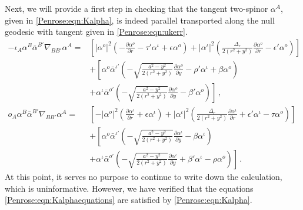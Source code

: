 Next, we will provide a first step in checking that the tangent two-spinor $\alpha^A$, given in \eqref{Penrose:eqn:Kalpha}, is indeed parallel transported along the null geodesic with tangent given in \eqref{Penrose:eqn:ukerr}.
\begin{equation}\label{Penrose:eqn:Kalphaequations}
\begin{aligned}
-\iota_A	\alpha^B \bar{\alpha}^{B'} \nabla_{BB'}\alpha^A = &\left\lbrack  |\alpha^o|^2
\left(-\frac{\partial \alpha^o}{\partial r} - \tau' \alpha^{\iota}+\epsilon \alpha^o \right) + |\alpha^{\iota}|^2
\left( \frac{\Delta_r}{2 (r^2+y^2)} \frac{\partial \alpha^{o}}{\partial r} - \epsilon' \alpha^{o} \right)\right
\rbrack \\
                                                                &+  \left\lbrack \alpha^o\bar{\alpha}^{\iota'}
                                                                \left(-\sqrt{\frac{a^2-y^2}{2
                                                                (r^2+y^2)}}\frac{\partial \alpha^o}{\partial y}
                                                            -\rho' \alpha^{\iota} + \beta \alpha^o \right) \right. \\
                                                            &\left.+  \alpha^{\iota}\bar{\alpha}^{o'} \left(-\sqrt{\frac{a^2-y^2}{2(r^2+y^2)}}\frac{\partial \alpha^o}{\partial y} -\beta' \alpha^o \right) \right\rbrack \, , \\
o_A	\alpha^B \bar{\alpha}^{B'} \nabla_{BB'}\alpha^A = &\left\lbrack -|\alpha^o|^2  \left(\frac{\partial \alpha^{\iota}}{\partial r}+\epsilon \alpha^{\iota} \right) + |\alpha^{\iota}|^2 \left( \frac{\Delta_r}{2(r^2+y^2)}  \frac{\partial \alpha^{\iota}}{\partial r} + \epsilon' \alpha^{\iota} - \tau \alpha^{o}\right) \right \rbrack  \\
                                                        &+  \left\lbrack \alpha^o\bar{\alpha}^{\iota'}
                                                        \left(-\sqrt{\frac{a^2-y^2}{2(r^2+y^2)}}\frac{\partial
                                                        \alpha^{\iota}}{\partial y} -\beta \alpha^{\iota}\right) \right. \\
                                                           &\left.+  \alpha^{\iota}\bar{\alpha}^{o'} \left(-\sqrt{\frac{a^2-y^2}{2(r^2+y^2)}}\frac{\partial \alpha^{\iota}}{\partial y} +\beta' \alpha^{\iota} - \rho \alpha^o \right) \right\rbrack \, .
\end{aligned}
\end{equation}
At this point, it serves no purpose to continue to write down the calculation, which is uninformative. However, we have verified that the equations \eqref{Penrose:eqn:Kalphaequations} are satisfied by \eqref{Penrose:eqn:Kalpha}.


